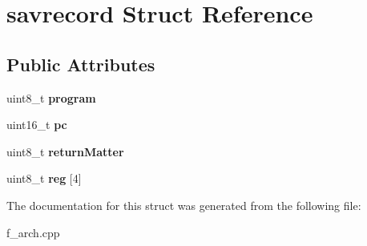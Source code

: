 \hypertarget{structsavrecord}{}\section{savrecord Struct Reference}
\label{structsavrecord}
\subsection*{Public Attributes}
\begin{DoxyCompactItemize}
\item 
\mbox{\label{structsavrecord_ae2e28ae32bdd1094951bb7498df490a4}} 
uint8\+\_\+t {\bfseries program}
\item 
\mbox{\label{structsavrecord_ae74b403322b6a1b8f0407244ea179db7}} 
uint16\+\_\+t {\bfseries pc}
\item 
\mbox{\label{structsavrecord_a01171c52ca2800517b3a425c597ab8de}} 
uint8\+\_\+t {\bfseries return\+Matter}
\item 
\mbox{\label{structsavrecord_a25c1c041158fffd86e280dc20bca07a4}} 
uint8\+\_\+t {\bfseries reg} \mbox{[}4\mbox{]}
\end{DoxyCompactItemize}


The documentation for this struct was generated from the following file\+:\begin{DoxyCompactItemize}
\item 
f\+\_\+arch.\+cpp\end{DoxyCompactItemize}
